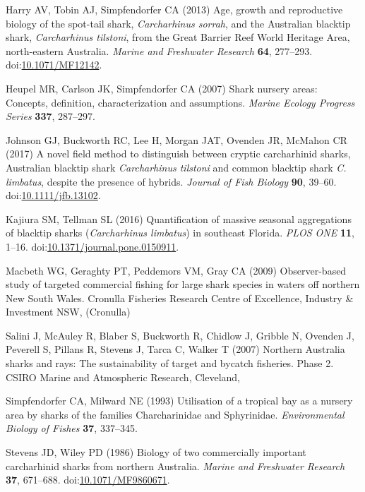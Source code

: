 \documentclass[]{article}
\begin{document}
\hypertarget{ref-harry_age_2013}{}
Harry AV, Tobin AJ, Simpfendorfer CA (2013) Age, growth and reproductive
biology of the spot-tail shark, \emph{Carcharhinus sorrah}, and the
Australian blacktip shark, \emph{Carcharhinus tilstoni}, from the Great
Barrier Reef World Heritage Area, north-eastern Australia. \emph{Marine
and Freshwater Research} \textbf{64}, 277--293.
doi:\href{https://doi.org/10.1071/MF12142}{10.1071/MF12142}.

\hypertarget{ref-heupel_shark_2007}{}
Heupel MR, Carlson JK, Simpfendorfer CA (2007) Shark nursery areas:
Concepts, definition, characterization and assumptions. \emph{Marine
Ecology Progress Series} \textbf{337}, 287--297.

\hypertarget{ref-johnson_novel_2017}{}
Johnson GJ, Buckworth RC, Lee H, Morgan JAT, Ovenden JR, McMahon CR
(2017) A novel field method to distinguish between cryptic carcharhinid
sharks, Australian blacktip shark \emph{Carcharhinus tilstoni} and
common blacktip shark \emph{C. limbatus}, despite the presence of
hybrids. \emph{Journal of Fish Biology} \textbf{90}, 39--60.
doi:\href{https://doi.org/10.1111/jfb.13102}{10.1111/jfb.13102}.

\hypertarget{ref-kajiura_quantification_2016}{}
Kajiura SM, Tellman SL (2016) Quantification of massive seasonal
aggregations of blacktip sharks (\emph{Carcharhinus limbatus}) in
southeast Florida. \emph{PLOS ONE} \textbf{11}, 1--16.
doi:\href{https://doi.org/10.1371/journal.pone.0150911}{10.1371/journal.pone.0150911}.

\hypertarget{ref-macbeth_observer-based_2009}{}
Macbeth WG, Geraghty PT, Peddemors VM, Gray CA (2009) Observer-based
study of targeted commercial fishing for large shark species in waters
off northern New South Wales. Cronulla Fisheries Research Centre of
Excellence, Industry \& Investment NSW, (Cronulla)

\hypertarget{ref-salini_northern_2007}{}
Salini J, McAuley R, Blaber S, Buckworth R, Chidlow J, Gribble N,
Ovenden J, Peverell S, Pillans R, Stevens J, Tarca C, Walker T (2007)
Northern Australia sharks and rays: The sustainability of target and
bycatch fisheries. Phase 2. CSIRO Marine and Atmospheric Research,
Cleveland,

\hypertarget{ref-simpfendorfer_utilisation_1993}{}
Simpfendorfer CA, Milward NE (1993) Utilisation of a tropical bay as a
nursery area by sharks of the families Charcharinidae and Sphyrinidae.
\emph{Environmental Biology of Fishes} \textbf{37}, 337--345.

\hypertarget{ref-stevens_biology_1986}{}
Stevens JD, Wiley PD (1986) Biology of two commercially important
carcharhinid sharks from northern Australia. \emph{Marine and Freshwater
Research} \textbf{37}, 671--688.
doi:\href{https://doi.org/10.1071/MF9860671}{10.1071/MF9860671}.
\end{document}
